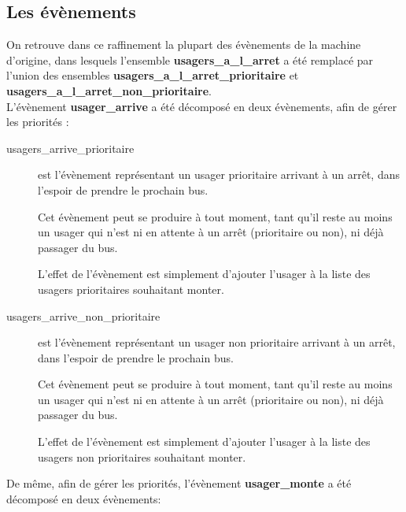 \documentclass[a4paper,titlepage]{report}
\begin{document}
	\subsection{Les évènements}
		On retrouve dans ce raffinement la plupart des évènements de la machine d'origine, dans lesquels l'ensemble \textbf{usagers\_a\_l\_arret} a été remplacé par l'union des ensembles \textbf{usagers\_a\_l\_arret\_prioritaire} et \textbf{usagers\_a\_l\_arret\_non\_prioritaire}.\\
		
		L'évènement \textbf{usager\_arrive} a été décomposé en deux évènements, afin de gérer les priorités :
		\begin{description}
			\item[usagers\_arrive\_prioritaire] est l'évènement représentant un usager prioritaire arrivant à un arrêt, dans l'espoir de prendre le prochain bus.
			
			Cet évènement peut se produire à tout moment, tant qu'il reste au moins un usager qui n'est ni en attente à un arrêt (prioritaire ou non), ni déjà passager du bus.
			
			L'effet de l'évènement est simplement d'ajouter l'usager à la liste des usagers prioritaires souhaitant monter.
			
			\item[usagers\_arrive\_non\_prioritaire] est l'évènement représentant un usager non prioritaire arrivant à un arrêt, dans l'espoir de prendre le prochain bus.
			
			Cet évènement peut se produire à tout moment, tant qu'il reste au moins un usager qui n'est ni en attente à un arrêt (prioritaire ou non), ni déjà passager du bus.
			
			L'effet de l'évènement est simplement d'ajouter l'usager à la liste des usagers non prioritaires souhaitant monter.\\
		\end{description}
		

		De même, afin de gérer les priorités, l'évènement \textbf{usager\_monte} a été décomposé en deux évènements:
		
\end{document}
